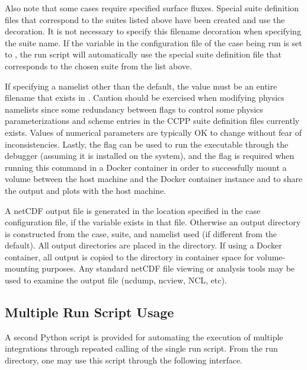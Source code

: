 Also note that some cases require specified surface fluxes. Special suite definition files that correspond to the suites listed above have been created and use the  decoration. It is not necessary to specify this filename decoration when specifying the suite name. If the  variable in the configuration file of the case being run is set to , the run script will automatically use the special suite definition file that corresponds to the chosen suite from the list above.

If specifying a namelist other than the default, the value must be an entire filename that exists in . Caution should be exercised when modifying physics namelists since some redundancy between flags to control some physics parameterizations and scheme entries in the CCPP suite definition files currently exists. Values of numerical parameters are typically OK to change without fear of inconsistencies. Lastly, the  flag can be used to run the executable through the  debugger (assuming it is installed on the system), and the  flag is required when running this command in a Docker container in order to successfully mount a volume between the host machine and the Docker container instance and to share the output and plots with the host machine.

A netCDF output file is generated in the location specified in the case
configuration file, if the  variable exists in that file. Otherwise an output directory is constructed from the case, suite, and namelist used (if different from the default). All output directories are placed in the  directory. If using a Docker container, all output is copied to the  directory in container space for volume-mounting purposes. Any standard netCDF file viewing or analysis tools may be used to
examine the output file (ncdump, ncview, NCL, etc).

\subsection{Multiple Run Script Usage}\label{subsection: multirunscript}

A second Python script is provided for automating the execution of multiple integrations through repeated calling of the single run script. From the run directory, one may use this script through the following interface.

